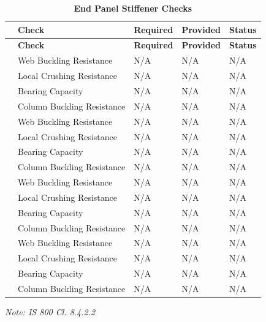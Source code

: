 \documentclass[12pt,a4paper]{report}
\numberwithin{table}{chapter}
\numberwithin{figure}{chapter}
\begin{document}
\vspace{1em}

\begin{longtable}{|C{2.5cm}|L{3.5cm}|C{3.5cm}|>{\centering\arraybackslash}p{4.2cm}|C{1.8cm}|}
\caption{\textbf{End Panel Stiffener Checks}}
\hline
{} \textbf{} & \textbf{Check} & \textbf{Required} & \textbf{Provided} & \textbf{Status} \\[6pt]
\hline
\endfirsthead
\hline
{} \textbf{} & \textbf{Check} & \textbf{Required} & \textbf{Provided} & \textbf{Status} \\[6pt]
\hline
\endhead
{} & Web Buckling Resistance & N/A & N/A & N/A \\[6pt]
 & Local Crushing Resistance & N/A & N/A & N/A \\[6pt]
 & Bearing Capacity & N/A & N/A & N/A \\[6pt]
 & Column Buckling Resistance & N/A & N/A & N/A \\[6pt]
\hline
{} & Web Buckling Resistance & N/A & N/A & N/A \\[6pt]
 & Local Crushing Resistance & N/A & N/A & N/A \\[6pt]
 & Bearing Capacity & N/A & N/A & N/A \\[6pt]
 & Column Buckling Resistance & N/A & N/A & N/A \\[6pt]
\hline
{} & Web Buckling Resistance & N/A & N/A & N/A \\[6pt]
 & Local Crushing Resistance & N/A & N/A & N/A \\[6pt]
 & Bearing Capacity & N/A & N/A & N/A \\[6pt]
 & Column Buckling Resistance & N/A & N/A & N/A \\[6pt]
\hline
{} & Web Buckling Resistance & N/A & N/A & N/A \\[6pt]
 & Local Crushing Resistance & N/A & N/A & N/A \\[6pt]
 & Bearing Capacity & N/A & N/A & N/A \\[6pt]
 & Column Buckling Resistance & N/A & N/A & N/A \\[6pt]
\hline
\end{longtable}
\noindent\textit{Note: IS 800 Cl. 8.4.2.2}
\end{document}
